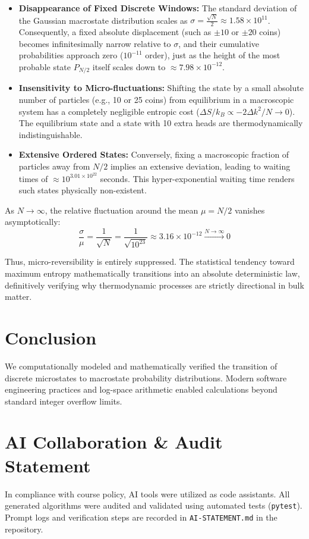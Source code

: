 \documentclass[10pt, a4paper]{article}
\begin{document}
\begin{itemize}
    \item \textbf{Disappearance of Fixed Discrete Windows:} The standard deviation of the Gaussian macrostate distribution scales as $\sigma = \frac{\sqrt{N}}{2} \approx 1.58 \times 10^{11}$. Consequently, a fixed absolute displacement (such as $\pm 10$ or $\pm 20$ coins) becomes infinitesimally narrow relative to $\sigma$, and their cumulative probabilities approach zero ($10^{-11}$ order), just as the height of the most probable state $P_{N/2}$ itself scales down to $\approx 7.98 \times 10^{-12}$.
    \item \textbf{Insensitivity to Micro-fluctuations:} Shifting the state by a small absolute number of particles (e.g., 10 or 25 coins) from equilibrium in a macroscopic system has a completely negligible entropic cost ($\Delta S / k_B \propto -2 \Delta k^2 / N \to 0$). The equilibrium state and a state with 10 extra heads are thermodynamically indistinguishable.
    \item \textbf{Extensive Ordered States:} Conversely, fixing a macroscopic fraction of particles away from $N/2$ implies an extensive deviation, leading to waiting times of $\approx 10^{3.01 \times 10^{22}}$ seconds. This hyper-exponential waiting time renders such states physically non-existent.
\end{itemize}

As $N \to \infty$, the relative fluctuation around the mean $\mu = N/2$ vanishes asymptotically:
$$\frac{\sigma}{\mu} = \frac{1}{\sqrt{N}} = \frac{1}{\sqrt{10^{23}}} \approx 3.16 \times 10^{-12} \xrightarrow{N \to \infty} 0$$

Thus, micro-reversibility is entirely suppressed. The statistical tendency toward maximum entropy mathematically transitions into an absolute deterministic law, definitively verifying why thermodynamic processes are strictly directional in bulk matter.

\section{Conclusion}
We computationally modeled and mathematically verified the transition of discrete microstates to macrostate probability distributions. Modern software engineering practices and log-space arithmetic enabled calculations beyond standard integer overflow limits.

\newpage
\appendix
\section{AI Collaboration \& Audit Statement}
In compliance with course policy, AI tools were utilized as code assistants. All generated algorithms were audited and validated using automated tests (\texttt{pytest}). Prompt logs and verification steps are recorded in \texttt{AI-STATEMENT.md} in the repository.
\end{document}
